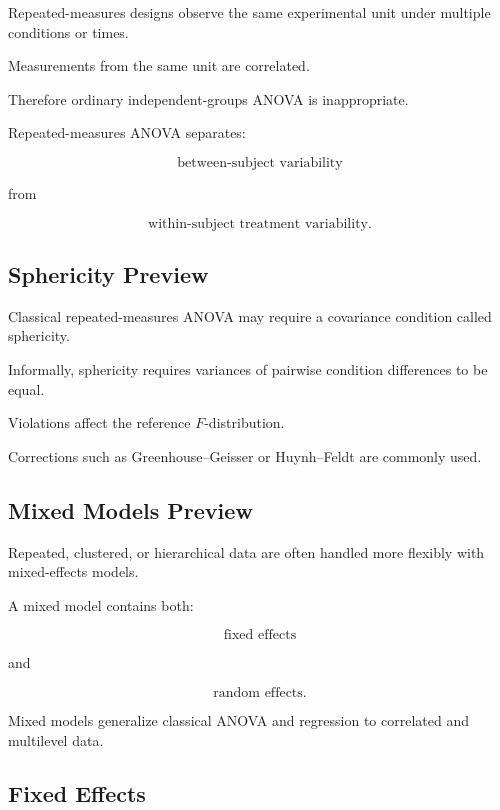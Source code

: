 Repeated-measures designs observe the same experimental unit under
multiple conditions or times.

Measurements from the same unit are correlated.

Therefore ordinary independent-groups ANOVA is inappropriate.

Repeated-measures ANOVA separates:

\[
\boxed{
\text{between-subject variability}
}
\]

from

\[
\boxed{
\text{within-subject treatment variability}.
}
\]

\subsection{Sphericity Preview}
\label{subsec:sphericity-preview}

Classical repeated-measures ANOVA may require a covariance condition
called sphericity.

Informally, sphericity requires variances of pairwise condition
differences to be equal.

Violations affect the reference \(F\)-distribution.

Corrections such as Greenhouse--Geisser or Huynh--Feldt are commonly
used.

\subsection{Mixed Models Preview}
\label{subsec:mixed-models-anova-preview}

Repeated, clustered, or hierarchical data are often handled more
flexibly with mixed-effects models.

A mixed model contains both:

\[
\boxed{
\text{fixed effects}
}
\]

and

\[
\boxed{
\text{random effects}.
}
\]

Mixed models generalize classical ANOVA and regression to correlated and
multilevel data.

\subsection{Fixed Effects}
\label{subsec:anova-fixed-effects}

